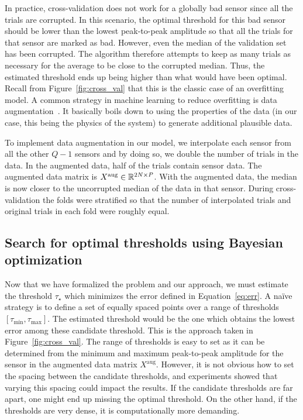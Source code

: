 In practice, cross-validation does not work for a globally bad sensor since all the trials are corrupted. In this scenario, the optimal threshold for this bad sensor should be lower than the lowest peak-to-peak amplitude so that all the trials for that sensor are marked as bad. However, even the median of the validation set has been corrupted. The algorithm therefore attempts to keep as many trials as necessary for the average to be close to the corrupted median. Thus, the estimated threshold ends up being higher than what would have been optimal. Recall from Figure~\ref{fig:cross_val} that this is the classic case of an overfitting model. A common strategy in machine learning to reduce overfitting is data augmentation~\citep{krizhevsky2012imagenet}. It basically boils down to using the properties of the data (in our case, this being the physics of the system) to generate additional plausible data.

To implement data augmentation in our model, we interpolate each sensor from all the other $Q-1$ sensors and by doing so, we double the number of trials in the data. In the augmented data, half of the trials contain sensor data. The augmented data matrix is $X^{\textrm{aug}} \in \mathbb{R}^{2N \times P}$. With the augmented data, the median is now closer to the uncorrupted median of the data in that sensor. During cross-validation the folds were stratified so that the number of interpolated trials and original trials in each fold were roughly equal.

\subsection{Search for optimal thresholds using Bayesian optimization}
\label{sec:bayesian_opt}
Now that we have formalized the problem and our approach, we must estimate the threshold $\tau_{\star}$ which minimizes the error defined in Equation~\eqref{eq:err}. A na\"ive strategy is to define a set of equally spaced points over a range of thresholds $[\tau_{\min}, \tau_{\max}]$. The estimated threshold would be the one which obtains the lowest error among these candidate threshold. This is the approach taken in Figure~\ref{fig:cross_val}. The range of thresholds is easy to set as it can be determined from the minimum and maximum peak-to-peak amplitude for the sensor in the augmented data matrix $X^{\textrm{aug}}$. However, it is not obvious how to set the spacing between the candidate thresholds, and experiments showed that varying this spacing could impact the results. If the candidate thresholds are far apart, one might end up missing the optimal threshold. On the other hand, if the thresholds are very dense, it is computationally more demanding.

